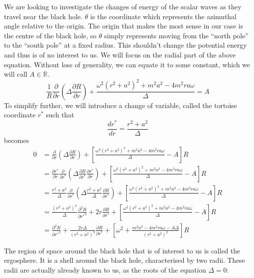 \documentclass[11pt]{article}
\numberwithin{equation}{section}
\numberwithin{figure}{section}
\numberwithin{table}{section}
\begin{document}
\par We are looking to investigate the changes of energy of the scalar waves as they travel near the black hole. $\theta$ is the coordinate which represents the azimuthal angle relative to the origin. The origin that makes the most sense in our case is the centre of the black hole, so $\theta$ simply represents moving from the ``north pole'' to the ``south pole'' at a fixed radius. This shouldn't change the potential energy and thus is of no interest to us. We will focus on the radial part of the above equation. Without loss of generality, we can equate it to some constant, which we will call $A\in\mathbb{R}$.
\begin{equation}
    \frac{1}{R}\frac{\partial}{\partial r}\left(\Delta\frac{\partial R}{\partial r}\right)+\frac{\omega^2(r^2+a^2)^2+m^2a^2-4m^2ra\omega}{\Delta}=A
    \label{eqn:radial wave equation}
\end{equation}
To simplify further, we will introduce a change of variable, called the tortoise coordinate $r^*$ such that
\begin{equation}
    \frac{dr^*}{dr}=\frac{r^2+a^2}{\Delta}
    \label{eqn:tortoise coordinates}
\end{equation}
 becomes
\begin{align*}
    0&=\frac{\partial}{\partial r}\left(\Delta\frac{\partial R}{\partial r}\right)+\left[\frac{\omega^2(r^2+a^2)^2+m^2a^2-4m^2ra\omega}{\Delta}-A\right]R\\
    &=\frac{\partial r^*}{\partial r}\frac{\partial}{\partial r^*}\left(\Delta\frac{\partial R}{\partial r^*}\frac{\partial r^*}{\partial r}\right)+\left[\frac{\omega^2(r^2+a^2)^2+m^2a^2-4m^2ra\omega}{\Delta}-A\right]R\\
    &=\frac{r^2+a^2}{\Delta}\frac{\partial}{\partial r^*}\left(\Delta\frac{r^2+a^2}{\Delta}\frac{\partial R}{\partial r^*}\right)+\left[\frac{\omega^2(r^2+a^2)^2+m^2a^2-4m^2ra\omega}{\Delta}-A\right]R\\
    &=\frac{(r^2+a^2)^2}{\Delta}\frac{\partial^2 R}{\partial {r^*}^2}+2r\frac{\partial R}{\partial r^*}+\left[\frac{\omega^2(r^2+a^2)^2+m^2a^2-4m^2ra\omega}{\Delta}-A\right]R\\
    &=\frac{\partial^2 R}{\partial {r^*}^2}+\frac{2r\Delta}{(r^2+a^2)^2}\frac{\partial R}{\partial r^*}+\left[\omega^2+\frac{m^2a^2-4m^2ra\omega-A\Delta}{(r^2+a^2)^2}\right]R
\end{align*}
\par The region of space around the black hole that is of interest to us is called the ergosphere. It is a shell around the black hole, characterised by two radii. These radii are actually already known to us, as the roots of the equation $\Delta=0$:
\end{document}
